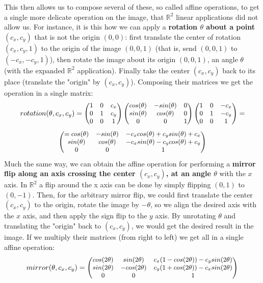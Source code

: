 \documentclass[11pt, a4paper, twoside]{article} %
\newcommand{\R}{\mathbb{R}} %
\begin{document}
{This then allows us to compose several of these, so called affine operations, to get a single more delicate operation on the image, that $\R^2$ linear applications did not allow us. For instance, it is this how we can apply a {\bf rotation $\theta$ about a point $(c_x,c_y)$} that is not the origin $(0,0)$: first translate the center of rotation $(c_x,c_y,1)$ to the origin of the image $(0,0,1)$ (that is, send $(0,0,1)$ to $(-c_x,-c_y,1)$), then rotate the image about its origin $(0,0,1)$, an angle $\theta$ (with the expanded $\R^2$ application). Finally take the center $(c_x,c_y)$ back to its place (translate the "origin" by $(c_x,c_y)$). Composing their matrices we get the operation in a single matrix:
\begin{equation}\small
rotation(\theta, c_x,c_y) = \begin{pmatrix}
1 & 0 & c_x\\
0 & 1 & c_y\\
0 & 0 & 1
\end{pmatrix}\begin{pmatrix}
cos(\theta) & -sin(\theta) & 0\\
sin(\theta) & cos(\theta) & 0\\
0 & 0 & 1
\end{pmatrix}\begin{pmatrix}
1 & 0 & -c_x\\
0 & 1 & -c_y\\
0 & 0 & 1
\end{pmatrix}=
\end{equation}
\begin{equation}
\small\begin{pmatrix}
=cos(\theta) & -sin(\theta) & -c_xcos(\theta)+c_ysin(\theta)+c_x\\
sin(\theta) & cos(\theta) & -c_xsin(\theta)-c_ycos(\theta)+c_y\\
0 & 0 & 1
\end{pmatrix}
\end{equation}
Much the same way, we can obtain the affine operation for performing a {\bf mirror flip along an axis crossing the center $(c_x,c_y)$, at an angle $\theta$} with the $x$ axis. In $\R^2$ a flip around the x axis can be done by simply flipping $(0,1)$ to $(0,-1)$. Then, for the arbitrary mirror flip, we could first translate the center $(c_x,c_y)$ to the origin, rotate the image by $-\theta$, so we align the desired axis with the $x$ axis, and then apply the sign flip to the $y$ axis. By unrotating $\theta$ and translating the "origin" back to $(c_x,c_y)$, we would get the desired result in the image. If we multiply their matrices (from right to left) we get all in a single affine operation:
\begin{equation}\label{mirror}\small
mirror(\theta,c_x,c_y)=\begin{pmatrix}
cos(2\theta) & sin(2\theta) & c_x(1-cos(2\theta))-c_ysin(2\theta) \\
sin(2\theta) & -cos(2\theta) & c_y(1+cos(2\theta))-c_xsin(2\theta)\\
0 & 0& 1
\end{pmatrix}
\end{equation}

}
\end{document}

